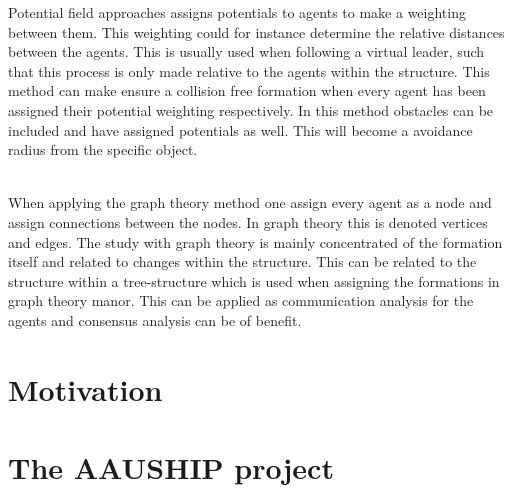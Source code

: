 \begin{description}[style=nextline]
	Potential field approaches assigns potentials to agents to make a weighting between them. This weighting could for instance determine the relative distances between the agents. This is usually used when following a virtual leader, such that this process is only made relative to the agents within the structure. This method can make ensure a collision free formation when every agent has been assigned their potential weighting respectively. In this method obstacles can be included and have assigned potentials as well. This will become a avoidance radius from the specific object.
	\item [Graph Theory Approaches]\\
	When applying the graph theory method one assign every agent as a node and assign connections between the nodes. In graph theory this is denoted vertices and edges. The study with graph theory is mainly concentrated of the formation itself and related to changes within the structure. This can be related to the structure within a tree-structure which is used when assigning the formations in graph theory manor. This can be applied as communication analysis for the agents and consensus analysis can be of benefit.
\end{description}

\section{Motivation}


\section{The AAUSHIP project}

